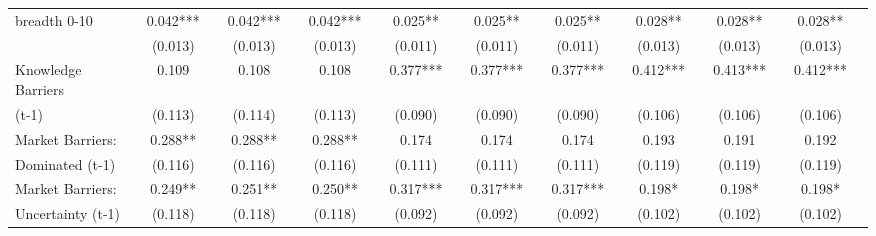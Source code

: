 \begin{table}[htbp]
\begin{tabular}{l*{18}{c}}
breadth 0-10        &       0.042***&               &       0.042***&               &       0.042***&               &       0.025** &               &       0.025** &               &       0.025** &               &       0.028** &               &       0.028** &               &       0.028** &               \\
                    &     (0.013)   &               &     (0.013)   &               &     (0.013)   &               &     (0.011)   &               &     (0.011)   &               &     (0.011)   &               &     (0.013)   &               &     (0.013)   &               &     (0.013)   &               \\
Knowledge Barriers  &       0.109   &               &       0.108   &               &       0.108   &               &       0.377***&               &       0.377***&               &       0.377***&               &       0.412***&               &       0.413***&               &       0.412***&               \\
(t-1)               &     (0.113)   &               &     (0.114)   &               &     (0.113)   &               &     (0.090)   &               &     (0.090)   &               &     (0.090)   &               &     (0.106)   &               &     (0.106)   &               &     (0.106)   &               \\
Market Barriers:    &       0.288** &               &       0.288** &               &       0.288** &               &       0.174   &               &       0.174   &               &       0.174   &               &       0.193   &               &       0.191   &               &       0.192   &               \\
Dominated (t-1)     &     (0.116)   &               &     (0.116)   &               &     (0.116)   &               &     (0.111)   &               &     (0.111)   &               &     (0.111)   &               &     (0.119)   &               &     (0.119)   &               &     (0.119)   &               \\
Market Barriers:    &       0.249** &               &       0.251** &               &       0.250** &               &       0.317***&               &       0.317***&               &       0.317***&               &       0.198*  &               &       0.198*  &               &       0.198*  &               \\
Uncertainty (t-1)   &     (0.118)   &               &     (0.118)   &               &     (0.118)   &               &     (0.092)   &               &     (0.092)   &               &     (0.092)   &               &     (0.102)   &               &     (0.102)   &               &     (0.102)   &               \\

\end{tabular}
\end{table}
